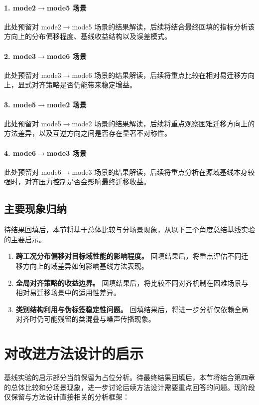 \paragraph{1. mode2$\rightarrow$mode5 场景}
此处预留对 mode2$\rightarrow$mode5 场景的结果解读，后续将结合最终回填的指标分析该方向上的分布偏移程度、基线收益结构以及误差模式。

\paragraph{2. mode3$\rightarrow$mode6 场景}
此处预留对 mode3$\rightarrow$mode6 场景的结果解读，后续将重点比较在相对易迁移方向上，显式对齐策略是否仍能带来稳定增益。

\paragraph{3. mode5$\rightarrow$mode2 场景}
此处预留对 mode5$\rightarrow$mode2 场景的结果解读，后续将重点观察困难迁移方向上的方法差异，以及互逆方向之间是否存在显著不对称性。

\paragraph{4. mode6$\rightarrow$mode3 场景}
此处预留对 mode6$\rightarrow$mode3 场景的结果解读，后续将重点分析在源域基线本身较强时，对齐压力控制是否会影响最终迁移收益。

\subsection{主要现象归纳}
待结果回填后，本节将基于总体比较与分场景现象，从以下三个角度总结基线实验的主要启示。

\begin{enumerate}
\item \textbf{跨工况分布偏移对目标域性能的影响程度。} 回填结果后，将重点评估不同迁移方向上的域差异如何影响基线方法表现。
\item \textbf{全局对齐策略的收益边界。} 回填结果后，将比较不同对齐机制在困难场景与相对易迁移场景中的适用性差异。
\item \textbf{类别结构利用与伪标签稳定性问题。} 回填结果后，将进一步分析仅依赖全局对齐时仍可能残留的类混叠与噪声传播现象。
\end{enumerate}

\section{对改进方法设计的启示}
基线实验的启示部分当前保留为占位分析。待最终结果回填后，本节将结合第四章的总体比较和分场景现象，进一步讨论后续方法设计需要重点回答的问题。现阶段仅保留与方法设计直接相关的分析框架：

